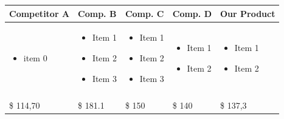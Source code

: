 \documentclass[11pt,a4paper,titlepage]{article}
\begin{document}
\begin{tabular}{| m{80 pt} | m{80 pt} | m{80 pt} | m{80 pt} | m{80 pt} |}
  Competitor A & Comp. B & Comp. C & Comp. D & Our Product\\\hline
  \begin{itemize} \tiny \item  item 0\end{itemize} & 
    \begin{itemize} \tiny 
    \item Item 1 
    \item Item 2
    \item Item 3
    \end{itemize} & 
    \begin{itemize} \tiny 
    \item Item 1
    \item Item 2
    \item Item 3 \end{itemize}& 
    \begin{itemize} \tiny 
    \item Item 1
    \item Item 2
    \end{itemize}& 
    \begin{itemize} \tiny 
    \item Item 1
    \item Item 2
    \end{itemize}\\
    & & & &\\ \hline
    \$ 114,70 & \$ 181.1 & \$ 150 & \$ 140 & \$ 137,3\\\hline
\end{tabular}
\end{document}
